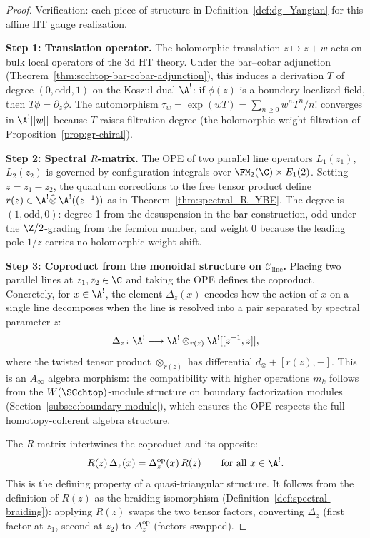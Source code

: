 \begin{proof}
Verification: each piece of structure in Definition~\ref{def:dg_Yangian}
for this affine HT gauge realization.

\medskip
\noindent\textbf{Step 1: Translation operator.}
The holomorphic translation $z \mapsto z + w$ acts on bulk local operators of the 3d HT theory. Under the bar--cobar adjunction (Theorem~\ref{thm:scchtop-bar-cobar-adjunction}), this induces a derivation $T$ of degree $(0,\text{odd},1)$ on the Koszul dual $\A^!$: if $\phi(z)$ is a boundary-localized field, then $T\phi = \partial_z \phi$. The automorphism $\tau_w = \exp(wT) = \sum_{n \geq 0} w^n T^n / n!$ converges in $\A^![[w]]$ because $T$ raises filtration degree (the holomorphic weight filtration of Proposition~\ref{prop:gr-chiral}).

\medskip
\noindent\textbf{Step 2: Spectral $R$-matrix.}
The OPE of two parallel line operators $L_1(z_1)$, $L_2(z_2)$ is governed by configuration integrals over $\FM_2(\C) \times E_1(2)$. Setting $z = z_1 - z_2$, the quantum corrections to the free tensor product define $r(z) \in \A^! \widehat{\otimes}\, \A^!((z^{-1}))$ as in Theorem~\ref{thm:spectral_R_YBE}. The degree is $(1, \text{odd}, 0)$: degree 1 from the desuspension in the bar construction, odd under the $\Z/2$-grading from the fermion number, and weight 0 because the leading pole $1/z$ carries no holomorphic weight shift.

\medskip
\noindent\textbf{Step 3: Coproduct from the monoidal structure on $\mathcal{C}_{\mathrm{line}}$.}
Placing two parallel lines at $z_1, z_2 \in \C$ and taking the OPE defines the coproduct. Concretely, for $x \in \A^!$, the element $\Delta_z(x)$ encodes how the action of $x$ on a single line decomposes when the line is resolved into a pair separated by spectral parameter $z$:
\[
\Delta_z \colon \A^! \longrightarrow \A^! \otimes_{r(z)} \A^![[z^{-1}, z]],
\]
where the twisted tensor product $\otimes_{r(z)}$ has differential $d_{\otimes} + [r(z), -]$. This is an $A_\infty$ algebra morphism: the compatibility with higher operations $m_k$ follows from the $W(\SCchtop)$-module structure on boundary factorization modules (Section~\ref{subsec:boundary-module}), which ensures the OPE respects the full homotopy-coherent algebra structure.

The $R$-matrix intertwines the coproduct and its opposite:
\[
R(z)\,\Delta_z(x) = \Delta_z^{\mathrm{op}}(x)\, R(z) \qquad \text{for all } x \in \A^!.
\]
This is the defining property of a quasi-triangular structure. It follows from the definition of $R(z)$ as the braiding isomorphism (Definition~\ref{def:spectral-braiding}): applying $R(z)$ swaps the two tensor factors, converting $\Delta_z$ (first factor at $z_1$, second at $z_2$) to $\Delta_z^{\mathrm{op}}$ (factors swapped).


\end{proof}
